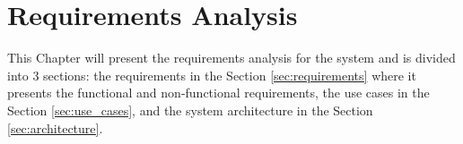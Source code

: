 \chapter{Requirements Analysis}
\label{ch:requirements_analysis}

This Chapter will present the requirements analysis for the system and is
divided into 3 sections: the requirements in the Section \ref{sec:requirements}
where it presents the functional and non-functional requirements, the use cases
in the Section \ref{sec:use_cases}, and the system architecture in the Section
\ref{sec:architecture}.




